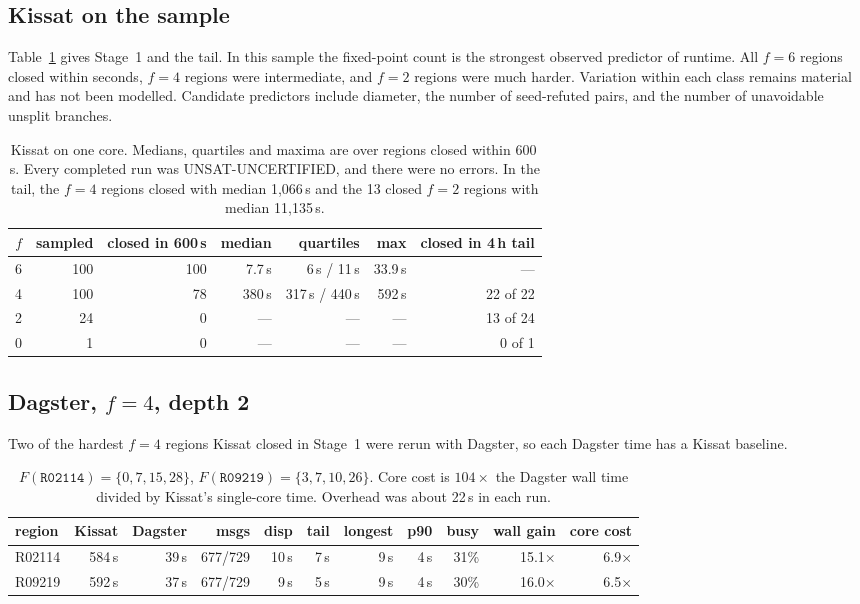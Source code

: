 \documentclass[11pt,a4paper,oneside]{report}
\theoremstyle{definition}
\newcommand{\code}[1]{\texttt{#1}}
\newcommand{\st}[1]{\textsf{#1}}
\begin{document}
\subsection{Kissat on the sample}

Table~\ref{p8-tab:kissat} gives Stage~1 and the tail. In this sample the fixed-point count is the
strongest observed predictor of runtime. All $f=6$ regions closed within seconds, $f=4$
regions were intermediate, and $f=2$ regions were much harder. Variation within each class
remains material and has not been modelled. Candidate predictors include diameter, the number
of seed-refuted pairs, and the number of unavoidable unsplit branches.

\begin{table}[H]
\centering
\begin{tabular}{@{}rrrrrrr@{}}
\toprule
$f$ & sampled & closed in 600\,s & median & quartiles & max & closed in 4\,h tail \\
\midrule
6 & 100 & 100 & 7.7\,s & 6\,s / 11\,s & 33.9\,s & --- \\
4 & 100 & 78 & 380\,s & 317\,s / 440\,s & 592\,s & 22 of 22 \\
2 & 24 & 0 & --- & --- & --- & 13 of 24 \\
0 & 1 & 0 & --- & --- & --- & 0 of 1 \\
\bottomrule
\end{tabular}
\caption{Kissat on one core. Medians, quartiles and maxima are over regions closed within
600\,s. Every completed run was \st{UNSAT-UNCERTIFIED}, and there were no errors. In the tail,
the $f=4$ regions closed with median 1{,}066\,s and the 13 closed $f=2$ regions with median
11{,}135\,s.}
\label{p8-tab:kissat}
\end{table}

\subsection{Dagster, $f=4$, depth 2}

Two of the hardest $f=4$ regions Kissat closed in Stage~1 were rerun with Dagster, so each
Dagster time has a Kissat baseline.

\begin{table}[H]
\centering
\small
\begin{tabular}{@{}lrrrrrrrrrr@{}}
\toprule
region & Kissat & Dagster & msgs & disp & tail & longest & p90 & busy & wall gain & core cost \\
\midrule
R02114 & 584\,s & 39\,s & 677/729 & 10\,s & 7\,s & 9\,s & 4\,s & 31\% & 15.1$\times$ & 6.9$\times$ \\
R09219 & 592\,s & 37\,s & 677/729 & 9\,s & 5\,s & 9\,s & 4\,s & 30\% & 16.0$\times$ & 6.5$\times$ \\
\bottomrule
\end{tabular}
\caption{$F(\code{R02114})=\{0,7,15,28\}$, $F(\code{R09219})=\{3,7,10,26\}$. Core cost is
$104\times$ the Dagster wall time divided by Kissat's single-core time. Overhead was about 22\,s
in each run.}
\label{p8-tab:f4}
\end{table}
\end{document}
